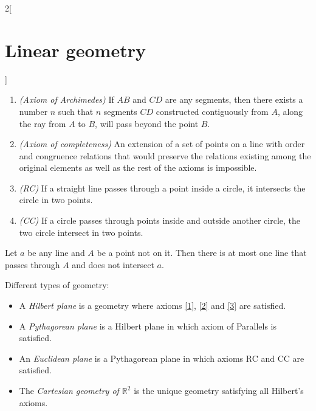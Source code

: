 \documentclass[../../../main.tex]{subfiles}
\begin{document}
\begin{multicols}{2}[\section{Linear geometry}]
\begin{axiom}
\begin{enumerate}
    \item \textit{(Axiom of Archimedes)} If $AB$ and $CD$ are any segments, then there exists a number $n$ such that $n$ segments $CD$ constructed contiguously from $A$, along the ray from $A$ to $B$, will pass beyond the point $B$.
    \item \textit{(Axiom of completeness)} An extension of a set of points on a line with order and congruence relations that would preserve the relations existing among the original elements as well as the rest of the axioms is impossible.
    \item \textit{(RC)} If a straight line passes through a point inside a circle, it intersects the circle in two points.
    \item \textit{(CC)} If a circle passes through points inside and outside another circle, the two circle intersect in two points.
\end{enumerate}
\end{axiom}
\begin{axiom}
\label{5}
Let $a$ be any line and $A$ be a point not on it. Then there is at most one line that passes through $A$ and does not intersect $a$.
\end{axiom}
\begin{definition}
Different types of geometry: 
\begin{itemize}
    \item A \textit{Hilbert plane} is a geometry where axioms \ref{1}, \ref{2} and \ref{3} are satisfied.
    \item A \textit{Pythagorean plane} is a Hilbert plane in which axiom of Parallels is satisfied.
    \item An \textit{Euclidean plane} is a Pythagorean plane in which axioms RC and CC are satisfied.
    \item The \textit{Cartesian geometry of $\mathbb{R}^2$} is the unique geometry satisfying all Hilbert's axioms.
\end{itemize}
\end{definition}

\end{multicols}
\end{document}
